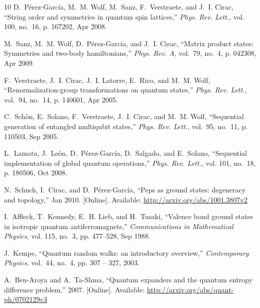 \documentclass[journal,twoside]{IEEEtran}
\newcommand{\1}{\mathbbm{1}}
\renewcommand{\>}{\rangle}
\newcommand{\<}{\langle}
\begin{document}
\begin{thebibliography}{10}
D.~P\'erez-Garc\'ia, M.~M. Wolf, M.~Sanz, F.~Verstraete, and J.~I. Cirac,
  ``String order and symmetries in quantum spin lattices,'' \emph{Phys. Rev.
  Lett.}, vol. 100, no.~16, p. 167202, Apr 2008.

M.~Sanz, M.~M. Wolf, D.~P\'erez-Garc\'ia, and J.~I. Cirac, ``Matrix product
  states: Symmetries and two-body hamiltonians,'' \emph{Phys. Rev. A}, vol.~79,
  no.~4, p. 042308, Apr 2009.

F.~Verstraete, J.~I. Cirac, J.~I. Latorre, E.~Rico, and M.~M. Wolf,
  ``Renormalization-group transformations on quantum states,'' \emph{Phys. Rev.
  Lett.}, vol.~94, no.~14, p. 140601, Apr 2005.

C.~Sch\"on, E.~Solano, F.~Verstraete, J.~I. Cirac, and M.~M. Wolf, ``Sequential
  generation of entangled multiqubit states,'' \emph{Phys. Rev. Lett.},
  vol.~95, no.~11, p. 110503, Sep 2005.

L.~Lamata, J.~Le\'on, D.~P\'erez-Garc\'ia, D.~Salgado, and E.~Solano,
  ``Sequential implementation of global quantum operations,'' \emph{Phys. Rev.
  Lett.}, vol. 101, no.~18, p. 180506, Oct 2008.

\BIBentryALTinterwordspacing
N.~Schuch, I.~Cirac, and D.~P\'erez-Garc\'ia, ``Peps as ground states:
  degeneracy and topology,'' Jan 2010. [Online]. Available:
  \url{http://arxiv.org/abs/1001.3807v2}
\BIBentrySTDinterwordspacing

I.~Affleck, T.~Kennedy, E.~H. Lieb, and H.~Tasaki, ``Valence bond ground states
  in isotropic quantum antiferromagnets,'' \emph{Communications in Mathematical
  Physics}, vol. 115, no.~3, pp. 477--528, Sep 1988.

J.~Kempe, ``Quantum random walks: an introductory overview,''
  \emph{Contemporary Physics}, vol.~44, no.~4, pp. 307 -- 327, 2003.

\BIBentryALTinterwordspacing
A.~Ben-Aroya and A.~Ta-Shma, ``Quantum expanders and the quantum entropy
  difference problem,'' 2007. [Online]. Available:
  \url{http://arxiv.org/abs/quant-ph/0702129v3}
\BIBentrySTDinterwordspacing

\end{thebibliography}



% 
\end{document}
